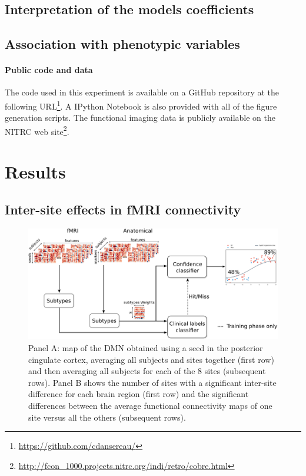 \documentclass[authoryear]{elsarticle}
\begin{document}
\subsection{Interpretation of the models coefficients}

\subsection{Association with phenotypic variables}


\paragraph{Public code and data}
The code used in this experiment is available on a 
GitHub repository at the following URL\footnote{\url{https://github.com/cdansereau/}}. A IPython Notebook is also provided with all of the figure generation scripts. The functional imaging data is publicly available on the NITRC web site\footnote{\url{http://fcon_1000.projects.nitrc.org/indi/retro/cobre.html}}.



\section{Results}

\subsection{Inter-site effects in fMRI connectivity}


\begin{figure}[htbp]
\begin{center}
\includegraphics[width=0.8\linewidth]{figures/full_model.png}
\end{center}
\caption[DMN variability across sites]{
Panel A: map of the DMN obtained using a seed in the posterior cingulate cortex, averaging all subjects and sites together (first row) and then averaging all subjects for each of the 8 sites (subsequent rows). Panel B shows the number of sites with a significant inter-site difference for each brain region (first row) and the significant differences between the average functional connectivity maps of one site versus all the others (subsequent rows).
}
\label{fig_DMN_variability}
\end{figure}
\end{document}
